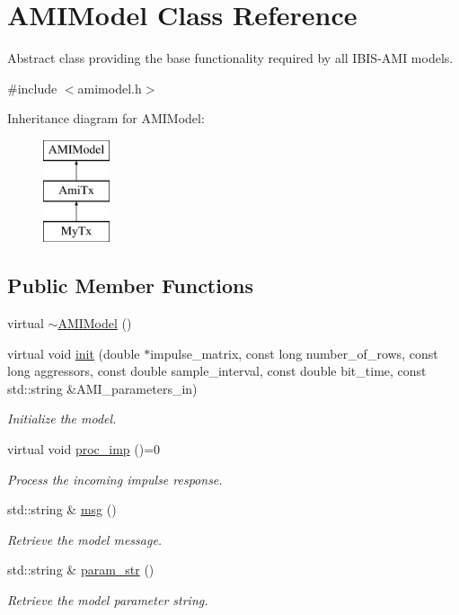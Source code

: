 \hypertarget{class_a_m_i_model}{}\section{A\+M\+I\+Model Class Reference}
\label{class_a_m_i_model}


Abstract class providing the base functionality required by all I\+B\+I\+S-\/\+A\+M\+I models.  




{\ttfamily \#include $<$amimodel.\+h$>$}

Inheritance diagram for A\+M\+I\+Model\+:\begin{figure}[H]
\begin{center}
\leavevmode
\includegraphics[height=3.000000cm]{class_a_m_i_model}
\end{center}
\end{figure}
\subsection*{Public Member Functions}
\begin{DoxyCompactItemize}
\item 
virtual \hyperlink{class_a_m_i_model_a6c266bc8306cef0ed802c49c8847e8fc}{$\sim$\+A\+M\+I\+Model} ()
\item 
virtual void \hyperlink{class_a_m_i_model_a8f45652e216686d0efa8db7e9dc0e915}{init} (double $\ast$impulse\+\_\+matrix, const long number\+\_\+of\+\_\+rows, const long aggressors, const double sample\+\_\+interval, const double bit\+\_\+time, const std\+::string \&A\+M\+I\+\_\+parameters\+\_\+in)
\begin{DoxyCompactList}\small\item\em Initialize the model. \end{DoxyCompactList}\item 
virtual void \hyperlink{class_a_m_i_model_a52d1f23607e7f12fa1ab61d809231c11}{proc\+\_\+imp} ()=0
\begin{DoxyCompactList}\small\item\em Process the incoming impulse response. \end{DoxyCompactList}\item 
std\+::string \& \hyperlink{class_a_m_i_model_ae65d47400fd3736682c229dab31392ad}{msg} ()
\begin{DoxyCompactList}\small\item\em Retrieve the model message. \end{DoxyCompactList}\item 
std\+::string \& \hyperlink{class_a_m_i_model_abb8b57f839746e955774d7bc8f1b5d02}{param\+\_\+str} ()
\begin{DoxyCompactList}\small\item\em Retrieve the model parameter string. \end{DoxyCompactList}\end{DoxyCompactItemize}
